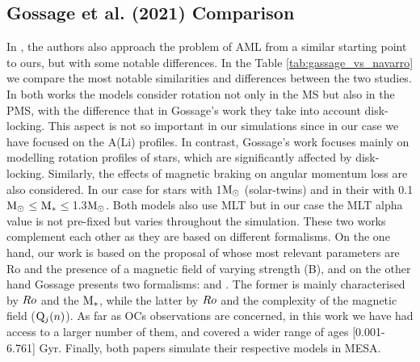 \documentclass[fleqn,usenatbib]{mnras}
\begin{document}
\subsection{Gossage et al. (2021) Comparison}
In \cite{Gossage2021}, the authors also approach the problem of AML from a similar starting point to ours, but with some notable differences. In the Table \ref{tab:gassage_vs_navarro} we compare the most notable similarities and differences between the two studies. In both works the models consider rotation not only in the MS but also in the PMS, with the difference that in Gossage's work they take into account disk-locking. This aspect is not so important in our simulations since in our case we have focused on the A(Li) profiles. In contrast, Gossage's work focuses mainly on modelling rotation profiles of stars, which are significantly affected by disk-locking. Similarly, the effects of magnetic braking on angular momentum loss are also considered. In our case for stars with 1$\mathrm{M}_\odot$ (solar-twins) and in their with 0.1$\mathrm{M}_\odot$$\le$$\mathrm{M}_*$$\le$1.3$\mathrm{M}_\odot$. Both models also use MLT but in our case the MLT alpha value is not pre-fixed but varies throughout the simulation. These two works complement each other as they are based on different formalisms. On the one hand, our work is based on the proposal of \cite{Gallet2013} whose most relevant parameters are Ro and the presence of a magnetic field of varying strength (B), and on the other hand Gossage presents two formalisms: \cite{Matt2015} and \cite{Garraffo2018}. The former is mainly characterised by $Ro$ and the $\mathrm{M}_*$, while the latter by $Ro$ and the complexity of the magnetic field ($\mathrm{Q}_j(n)$). As far as OCs observations are concerned, in this work we have had access to a larger number of them, and covered a wider range of ages [0.001-6.761] Gyr. Finally, both papers simulate their respective models in MESA.\par
\end{document}
